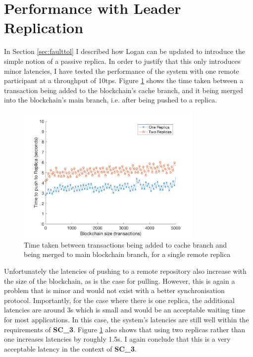 \documentclass[12pt,a4paper,twoside,openright]{report}
\begin{document}
	\section{Performance with Leader Replication}
	In Section \ref{sec:faulttol} I described how Logan can be updated to introduce the simple notion of a passive replica. 
	In order to justify that this only introduces minor latencies, I have tested the performance of the system with one remote participant at a throughput of 10tps. 
	Figure \ref{figs:confirmationtimes}  shows the time taken between a transaction being added to the blockchain's cache branch, and it being merged into the blockchain's main branch, i.e. after being pushed to a replica.
	\begin{figure}
		\centering
		\includegraphics[width=0.8\textwidth]{figs/confirmationlatencies.png}
		\caption{Time taken between transactions being added to cache branch and being merged to main blockchain branch, for a single remote replica}
		\label{figs:confirmationtimes}
	\end{figure}
	Unfortunately the latencies of pushing to a remote repository also increase with the size of the blockchain, as is the case for pulling.
	However, this is again a problem that is minor and would not exist with a better synchronisation protocol. 
	Importantly, for the case where there is one replica, the additional latencies are around 3s which is small and would be an acceptable waiting time for most applications.
	In this case, the system's latencies are still well within the requirements of \textbf{SC\_3}.
	Figure \ref{figs:confirmationtimes} also shows that using two replicas rather than one increases latencies by roughly 1.5s. 
	I again conclude that this is a very acceptable latency in the context of \textbf{SC\_3}.\\
\end{document}
